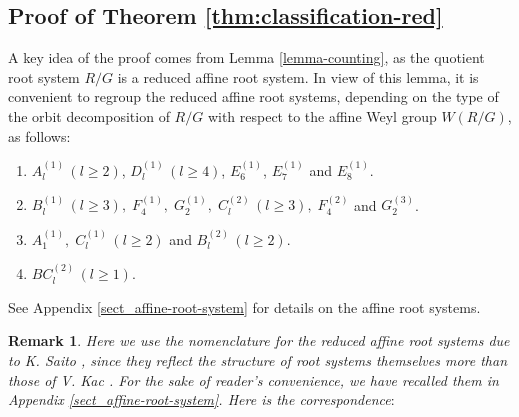 \documentclass[11pt]{amsart}
\newtheorem{rem}[thm]{Remark}%
\begin{document}
{\subsection{Proof of Theorem \ref{thm:classification-red}}
A key idea of the proof comes from Lemma \ref{lemma-counting}, as the quotient root system $R/G$ is a reduced affine root system. In view of this lemma, it is convenient to regroup the reduced affine root systems, depending on the type of the orbit decomposition of $R/G$ with respect to the affine Weyl group $W(R/G)$, as follows:
\begin{enumerate}
\item $A_l^{(1)}\, (l\geq 2)$, \; $D_l^{(1)}\, (l\geq 4)$,\; $E_6^{(1)}$, \; $E_7^{(1)}$ and 
$E_8^{(1)}$.
\item $B_l^{(1)}\, (l\geq 3), \; F_4^{(1)}, \; G_2^{(1)}, \; C_l^{(2)}\, (l\geq 3), \; F_4^{(2)}$ 
and $G_2^{(3)}$.
\item $A_1^{(1)}, \; C_l^{(1)}\, (l\geq 2)$ and $B_l^{(2)}\, (l\geq 2)$.
\item $BC_l^{(2)}\, (l\geq 1)$.
\end{enumerate}
See Appendix \ref{sect_affine-root-system} for details on the affine root systems. 
\begin{rem} {\rm
Here we use the nomenclature for the reduced affine root systems due to 
K. Saito \cite{Saito1985}, since they reflect the structure of root systems 
themselves more than those of V. Kac \cite{Kac1990}. For the sake of reader's 
convenience, we have recalled them in  Appendix  \ref{sect_affine-root-system}.  
Here is the correspondence$:$ \\
\begin{center}
\end{center}}
\end{rem}}
\end{document}
